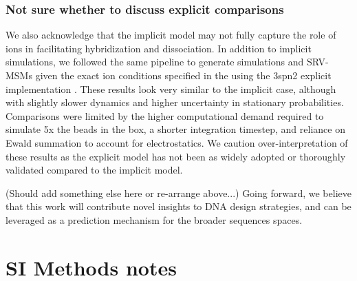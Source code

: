 \documentclass[journal=jpcbfk,manuscript=article]{achemso}
\begin{document}
\subsubsection{\label{sec:conc}Not sure whether to discuss explicit comparisons} 
We also acknowledge that the implicit model may not fully capture the role of ions in facilitating hybridization and dissociation. In addition to implicit simulations, we followed the same pipeline to generate simulations and SRV-MSMs given the exact ion conditions specified in the \citet{Sanstead2016} using the 3spn2 explicit implementation \citep{Hinckley2015}. These results look very similar to the implicit case, although with slightly slower dynamics and higher uncertainty in stationary probabilities. Comparisons were limited by the higher computational demand required to simulate 5x the beads in the box, a shorter integration timestep, and reliance on Ewald summation to account for electrostatics. We caution over-interpretation of these results as the explicit model has not been as widely adopted or thoroughly validated compared to the implicit model.

(Should add something else here or re-arrange above...) Going forward, we believe that this work will contribute novel insights to DNA design strategies, and can be leveraged as a prediction mechanism for the broader sequences spaces.


\section{\label{sec:Results}SI Methods notes}


\end{document}
